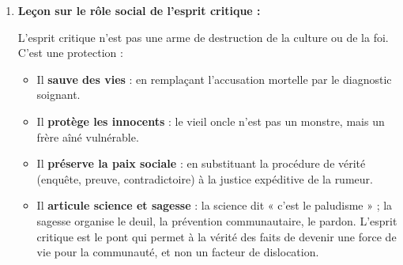 \documentclass[11pt]{article}
\newcommand{\cle}[1]{{\popxbold\color{popdark}#1}}
\begin{document}
\begin{corrige}
\begin{enumerate}
\item \textbf{Leçon sur le rôle social de l'esprit critique :}
\par L'esprit critique n'est pas une \cle{arme de destruction} de la culture ou de la foi. C'est une \cle{protection} :
\begin{itemize}
\item Il \textbf{sauve des vies} : en remplaçant l'accusation mortelle par le diagnostic soignant.
\item Il \textbf{protège les innocents} : le vieil oncle n'est pas un monstre, mais un frère aîné vulnérable.
\item Il \textbf{préserve la paix sociale} : en substituant la \cle{procédure de vérité} (enquête, preuve, contradictoire) à la \cle{justice expéditive} de la rumeur.
\item Il \textbf{articule science et sagesse} : la science dit « c'est le paludisme » ; la sagesse organise le deuil, la prévention communautaire, le pardon. L'esprit critique est le \cle{pont} qui permet à la vérité des faits de devenir une force de vie pour la communauté, et non un facteur de dislocation.
\end{itemize}
\end{enumerate}
\end{corrige}
\end{document}
